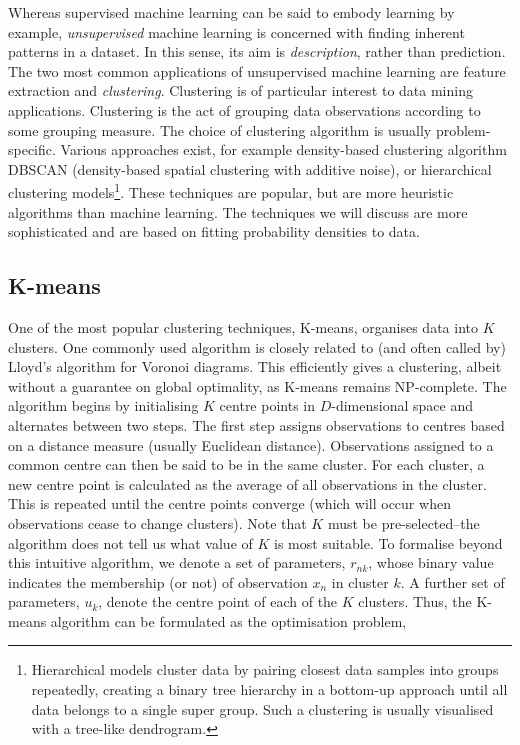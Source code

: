 \documentclass[11pt]{amsart}
\begin{document}
Whereas supervised machine learning can be said to embody learning by example, \emph{unsupervised} machine learning is concerned with finding inherent patterns in a dataset. In this sense, its aim is \emph{description}, rather than prediction. The two most common applications of unsupervised machine learning are feature extraction and \emph{clustering}. Clustering is of particular interest to data mining applications. Clustering is the act of grouping data observations according to some grouping measure. The choice of clustering algorithm is usually problem-specific. Various approaches exist, for example density-based clustering algorithm DBSCAN (density-based spatial clustering with additive noise), or hierarchical clustering models\footnote{Hierarchical models cluster data by pairing closest data samples into groups repeatedly, creating a binary tree hierarchy in a bottom-up approach until all data belongs to a single super group. Such a clustering is usually visualised with a tree-like dendrogram.}. These techniques are popular, but are more heuristic algorithms than machine learning. The techniques we will discuss are more sophisticated and are based on fitting probability densities to data.

\subsection{K-means}

One of the most popular clustering techniques, K-means, organises data into $K$ clusters. One commonly used algorithm is closely related to (and often called by) Lloyd's algorithm for Voronoi diagrams. This efficiently gives a clustering, albeit without a guarantee on global optimality, as K-means remains NP-complete. The algorithm begins by initialising $K$ centre points in $D$-dimensional space and alternates between two steps. The first step assigns observations to centres based on a distance measure (usually Euclidean distance). Observations assigned to a common centre can then be said to be in the same cluster. For each cluster, a new centre point is calculated as the average of all observations in the cluster. This is repeated until the centre points converge (which will occur when observations cease to change clusters). Note that $K$ must be pre-selected--the algorithm does not tell us what value of $K$ is most suitable. To formalise beyond this intuitive algorithm, we denote a set of parameters, $r_{nk}$, whose binary value indicates the membership (or not) of observation $x_n$ in cluster $k$. A further set of parameters, $u_k$, denote the centre point of each of the $K$ clusters. Thus, the K-means algorithm can be formulated as the optimisation problem,
\end{document}
